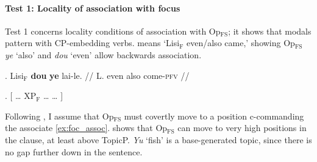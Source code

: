 \documentclass[11pt]{article}
\let\latextextsubscript\textsubscript
\let\textsubscript\latextextsubscript
\newcommand{\gap}[1]{\rule{1em}{0.4pt}\textsubscript{#1}}
\newcommand{\F}{\ensuremath{_{\mathrm{F}}}}
\newcommand{\opfs}{Op\(_{\mathrm{FS}}\)}
\begin{document}
\paragraph{Test 1: Locality of association with focus}
Test 1 concerns locality conditions of association with \opfs{}; it shows that modals pattern with CP-embedding verbs.
\Next means `Lisi\F{} even/also came,' showing \opfs{} \emph{ye} `also' and \emph{dou} `even' allow backwards association.
\begin{paracol}{2}
%
 \ex. \begingl
\gla  Lisi\F{} \textbf{dou} \nogloss{/} \textbf{ye} lai-le. //
  \glb  L. even also come-\textsc{pfv} //
\endgl

\switchcolumn
\ex. \label{ex:foc_assoc} \tikzmarknode{target}{\opfs} [ \ldots{} XP\F{} \ldots{} \tikzmarknode{base}{\gap{}} \ldots{} ]

\end{paracol}
Following \citet{lahiriFocusNegativePolarity1998,crnicNonmonotonicityNPILicensing2014,liuVarietiesAlternativesMandarin2017}, I assume that \opfs{} must covertly move to a position c-commanding the associate \cref{ex:foc_assoc}.
\Next shows that \opfs{} can move to very high positions in the clause, at least above TopicP.
\emph{Yu} `fish' is a base-generated topic, since there is no gap further down in the sentence.
\end{document}
